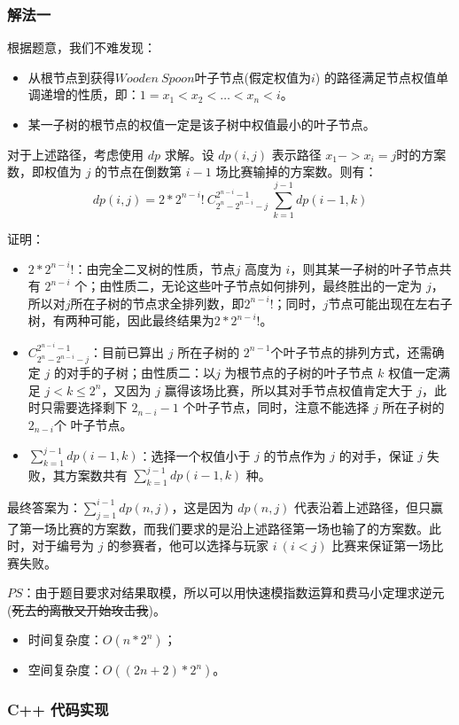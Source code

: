 \documentclass[UTF8, 12pt, a4paper, oneside]{ctexart}
\begin{document}
\subsubsection{解法一}
\par 根据题意，我们不难发现：
\begin{itemize}
    \item 从根节点到获得$Wooden \ Spoon$叶子节点(假定权值为$i$) 的路径满足节点权值单调递增的性质，即：$1 = x_1 < x_2 < … < x_n < i$。
    \item 某一子树的根节点的权值一定是该子树中权值最小的叶子节点。
\end{itemize}
\par 对于上述路径，考虑使用 $dp$ 求解。设 $dp(i, j)$ 表示路径 $x_1 -> x_i = j$时的方案数，即权值为 $j$ 的节点在倒数第 $i-1$ 场比赛输掉的方案数。则有： $$ dp(i, j) = 2 * 2^{n-i}! \ C_{2^n - 2^{n-i} - j}^{2^{n-i}-1} \ \sum_{k = 1}^{j - 1}dp(i-1, k)$$
\par 证明：
\begin{itemize}
    \item $2 * 2^{n-i}!$：由完全二叉树的性质，节点$j$ 高度为 $i$，则其某一子树的叶子节点共有 $2^{n-i}$ 个；由性质二，无论这些叶子节点如何排列，最终胜出的一定为 $j$，所以对$j$所在子树的节点求全排列数，即$2^{n-i}!$；同时，$j$节点可能出现在左右子树，有两种可能，因此最终结果为$2*2^{n-i}!$。
    \item $C_{2^n - 2^{n-i} - j}^{2^{n-i}-1}$：目前已算出 $j$ 所在子树的 $2^{n-1}$个叶子节点的排列方式，还需确定 $j$ 的对手的子树；由性质二：以$j$ 为根节点的子树的叶子节点 $k$ 权值一定满足 $j < k \leq 2^n$，又因为 $j$ 赢得该场比赛，所以其对手节点权值肯定大于 $j$，此时只需要选择剩下 $2_{n-i} - 1$ 个叶子节点，同时，注意不能选择 $j$ 所在子树的 $2_{n-i}个$ 叶子节点。
    \item $\sum_{k = 1}^{j - 1}dp(i-1, k)$：选择一个权值小于 $j$ 的节点作为 $j$ 的对手，保证 $j$ 失败，其方案数共有 $\sum_{k = 1}^{j - 1}dp(i-1, k)$ 种。
\end{itemize}
\par 最终答案为：$\sum_{j = 1}^{i-1}dp(n, j)$，这是因为 $dp(n, j)$ 代表沿着上述路径，但只赢了第一场比赛的方案数，而我们要求的是沿上述路径第一场也输了的方案数。此时，对于编号为 $j$ 的参赛者，他可以选择与玩家 $i \ (i < j)$ 比赛来保证第一场比赛失败。
\par $PS$：由于题目要求对结果取模，所以可以用快速模指数运算和费马小定理求逆元(\sout{死去的离散又开始攻击我})。
\begin{itemize}
    \item 时间复杂度：$O(n*2^n)$；
    \item 空间复杂度：$O((2n + 2)*2^n)$。
\end{itemize}
\subsubsection{C++ 代码实现}

\end{document}
